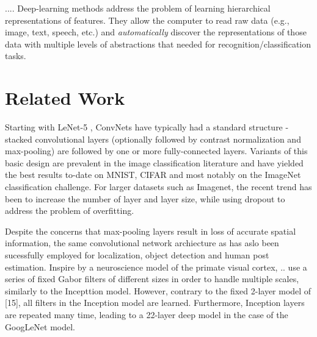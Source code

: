 \documentclass{sig-alternate}
\begin{document}
.... Deep-learning methods address the problem of learning hierarchical representations of features. They allow the computer to read raw data (e.g., image, text, speech, etc.) and \emph{automatically} discover the representations of those data with multiple levels of abstractions that needed for recognition/classification tasks.  


\section{Related Work}
Starting with LeNet-5 \citep{NIPS1989_293}, ConvNets have typically had a standard structure - stacked convolutional layers (optionally followed by contrast normalization and max-pooling) are followed by one or more fully-connected layers. Variants of this basic design are prevalent in the image classification literature and have yielded the best results to-date on MNIST, CIFAR and most notably on the ImageNet classification challenge. For larger datasets such as Imagenet, the recent trend has been to increase the number of layer and layer size, while using dropout \citep{JMLR:v15:srivastava14a} to address the problem of overfitting.

Despite the concerns that max-pooling layers result in loss of accurate spatial information, the same convolutional network archiecture as \citep{DBLP:journals/corr/TompsonJLB14} has aslo been sucessfully employed for localization, object detection and human post estimation. Inspire by a neuroscience model of the primate visual cortex, .. use a series of fixed Gabor filters of different sizes in order to handle multiple scales, similarly to the Incepttion model. However, contrary to the fixed 2-layer model of [15], all filters in the Inception model are learned. Furthermore, Inception layers are repeated many time, leading to a 22-layer deep model in the case of the GoogLeNet model.
\end{document}
